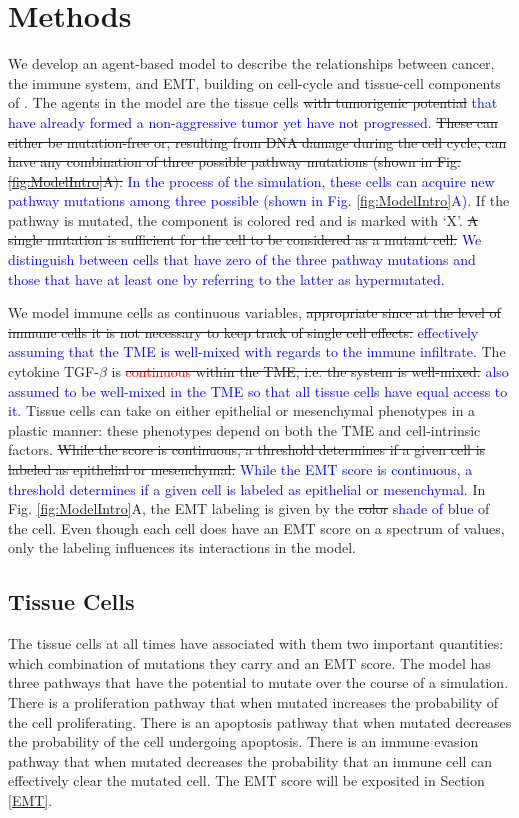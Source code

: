 \documentclass[11pt]{article}
\newcommand{\tcr} { \textcolor{red} }
\newcommand{\tcb} { \textcolor{blue} }
\begin{document}
\section{Methods}
We develop an agent-based model to describe the relationships between cancer, the immune system, and EMT, building on cell-cycle and tissue-cell components of \cite{guo17_multiscale}. 
The agents in the model are the tissue cells \sout{with tumorigenic potential} \tcb{that have already formed a non-aggressive tumor yet have not progressed}.
\sout{These can either be mutation-free or, resulting from DNA damage during the cell cycle, can have any combination of three possible pathway mutations (shown in Fig. \ref{fig:ModelIntro}A).}
\tcb{
In the process of the simulation, these cells can acquire new pathway mutations among three possible (shown in Fig. \ref{fig:ModelIntro}A).
}
If the pathway is mutated, the component is colored red and is marked with `X'.
\sout{A single mutation is sufficient for the cell to be considered as a mutant cell.}
\tcb{
We distinguish between cells that have zero of the three pathway mutations and those that have at least one by referring to the latter as hypermutated.
}
\par
We model immune cells as continuous variables, \sout{appropriate since at the level of immune cells it is not necessary to keep track of single cell effects.}
\tcb{
effectively assuming that the TME is well-mixed with regards to the immune infiltrate.
}
The cytokine TGF-$\beta$ is \sout{\tcr{continuous} within the TME, i.e. the system is well-mixed.}
\tcb{
also assumed to be well-mixed in the TME so that all tissue cells have equal access to it.
}
Tissue cells can take on either epithelial or mesenchymal phenotypes in a plastic manner: these phenotypes depend on both the TME and cell-intrinsic factors.
\sout{While the score is continuous, a threshold determines if a given cell is labeled as epithelial or mesenchymal.}
\tcb{While the EMT score is continuous, a threshold determines if a given cell is labeled as epithelial or mesenchymal.}
In Fig. \ref{fig:ModelIntro}A, the EMT labeling is given by the \sout{color} \tcb{shade of blue} of the cell.
Even though each cell does have an EMT score on a spectrum of values, only the labeling influences its interactions in the model.

\subsection{Tissue Cells}\label{TissueCells}
The tissue cells at all times have associated with them two important quantities: which combination of mutations they carry and an EMT score.
The model has three pathways that have the potential to mutate over the course of a simulation.
There is a proliferation pathway that when mutated increases the probability of the cell proliferating.
There is an apoptosis pathway that when mutated decreases the probability of the cell undergoing apoptosis.
There is an immune evasion pathway that when mutated decreases the probability that an immune cell can effectively clear the mutated cell.
The EMT score will be exposited in Section \ref{EMT}. 
\end{document}
